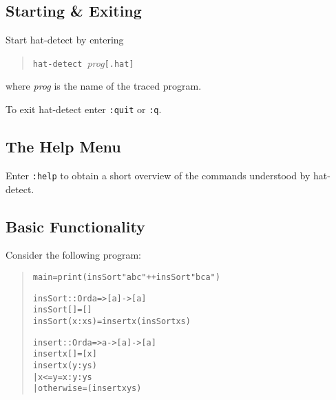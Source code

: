 \documentclass[12pt]{article}
\begin{document}




\subsection{Starting \& Exiting}

Start hat-detect by entering
\begin{quote}
\texttt{hat-detect}~\emph{prog}\texttt{[.hat]}
\end{quote}
where \emph{prog} is the name of the traced program.

To exit hat-detect enter \texttt{:quit} or \texttt{:q}.

\subsection{The Help Menu}

Enter \texttt{:help} to obtain a short overview of the commands
understood by hat-detect.

\subsection{Basic Functionality}

Consider the following program:
\begin{quote}
\begin{alltt}
main = print (insSort "abc" ++ insSort "bca")

insSort :: Ord a => [a] -> [a]
insSort [] = []
insSort (x:xs) = insert x (insSort xs)

insert :: Ord a => a -> [a] -> [a]
insert x [] = [x]
insert x (y:ys)
  | x <= y    = x:y:ys
  | otherwise = (insert x ys)
\end{alltt}
\end{quote}
\end{document}

